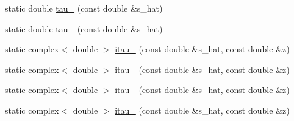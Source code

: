 \begin{DoxyCompactItemize}
static double \hyperlink{structeos_1_1Bremsstrahlung_af68817dd4b204589d133d149210a2365}{tau\_} (const double \&s\_\-hat)
\item 
static double \hyperlink{structeos_1_1Bremsstrahlung_aaec7f205ee9e02b804617fc8470d86d3}{tau\_} (const double \&s\_\-hat)
\item 
static complex$<$ double $>$ \hyperlink{structeos_1_1Bremsstrahlung_a34453235bd8805b9cb261261fc9a3b93}{itau\_} (const double \&s\_\-hat, const double \&z)
\item 
static complex$<$ double $>$ \hyperlink{structeos_1_1Bremsstrahlung_a07f9c13a763df1b9a0ce102bdc1159d2}{itau\_} (const double \&s\_\-hat, const double \&z)
\item 
static complex$<$ double $>$ \hyperlink{structeos_1_1Bremsstrahlung_a9a6a2545413301f3b2bcca85e4c6f909}{itau\_} (const double \&s\_\-hat, const double \&z)
\item 
static complex$<$ double $>$ \hyperlink{structeos_1_1Bremsstrahlung_add6d9efe0e4ae23f5751eb78d09c1225}{itau\_} (const double \&s\_\-hat, const double \&z)
\end{DoxyCompactItemize}


